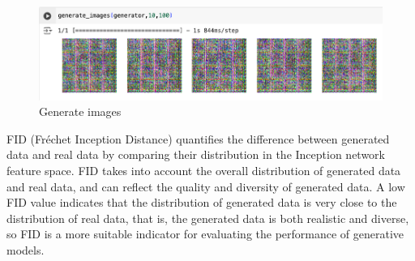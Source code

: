 \begin{figure}[H]
    \centering
    \includegraphics[width=1.2\linewidth]{./Images/generate_images.jpg}
    \caption{Generate images}
    \label{fig:my_picture}
\end{figure}


FID (Fréchet Inception Distance) quantifies the difference between generated data and real 
data by comparing their distribution in the Inception network feature space. FID takes into 
account the overall distribution of generated data and real data, and can reflect the quality 
and diversity of generated data. A low FID value indicates that the distribution of generated 
data is very close to the distribution of real data, that is, the generated data is both realistic 
and diverse, so FID is a more suitable indicator for evaluating the performance of generative models.